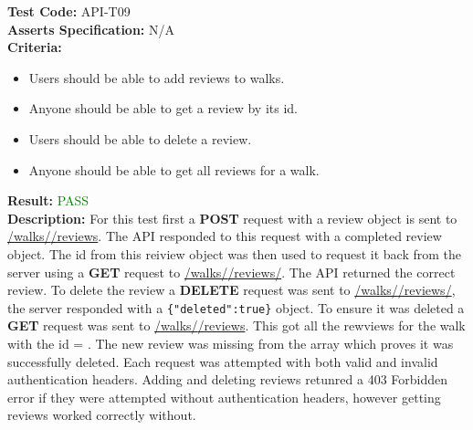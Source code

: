 \documentclass[11pt,a4paper]{report}
\begin{document}
\label{test:API-T09}
\noindent\textbf{Test Code:} API-T09\\
\textbf{Asserts Specification:} N/A \\ 
\textbf{Criteria:} \begin{itemize}
                     \item Users should be able to add reviews to walks. 
                     \item Anyone should be able to get a review by its id.
                     \item Users should be able to delete a review.
                     \item Anyone should be able to get all reviews for a walk.
                   \end{itemize}  
\textbf{Result:} \textcolor{green}{PASS}\\ 
\textbf{Description:} For this test first a \textbf{POST} request with a review object is sent to \url{/walks/}\url{/reviews}. The API responded to this request with a completed review object. The id from this reiview object was then used to request it back from the server using a \textbf{GET} request to \url{/walks/}\url{/reviews/}. The API returned the correct review. To delete the review a \textbf{DELETE} request was sent to \url{/walks/}\url{/reviews/}, the server responded with a \lstinline${"deleted":true}$ object. To ensure it was deleted a \textbf{GET} request was sent to \url{/walks/}\url{/reviews}. This got all the rewviews for the walk with the id = . The new review was missing from the array which proves it was successfully deleted. Each request was attempted with both valid and invalid authentication headers. Adding and deleting reviews retunred a 403 Forbidden error if they were attempted without authentication headers, however getting reviews worked correctly without. \\
\end{document}
